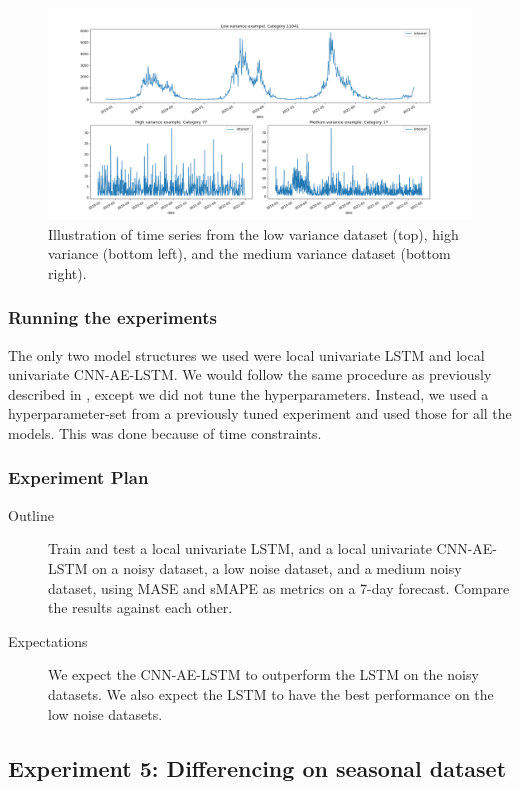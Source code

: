 \begin{figure}[h!]
  \centering
  \includegraphics[width=\textwidth]{./figs/code_generated/time-series-variance-examples.png}
  \hfill
  \caption{Illustration of time series from the low variance dataset (top), high variance (bottom left), and the medium variance dataset (bottom right).}
  \label{fig:time-series-variance-examples}
\end{figure}

\subsubsection{Running the experiments}
The only two model structures we used were local univariate LSTM
and local univariate CNN-AE-LSTM.
We would follow the same procedure as previously described in ,
except we did not tune the hyperparameters. Instead, we
used a hyperparameter-set from a previously tuned experiment and used those for all the models.
This was done because of time constraints.

\subsubsection{Experiment Plan}
\begin{description}
  \item[Outline]{
              Train and test a local univariate LSTM,
              and a local univariate CNN-AE-LSTM on a noisy dataset, a low noise dataset, and a medium noisy dataset,
              using MASE and sMAPE as metrics on a 7-day forecast.
              Compare the results against each other.
        }
\end{description}

\begin{description}
  \item[Expectations]{
              We expect the CNN-AE-LSTM to outperform the LSTM on the noisy datasets.
              We also expect the LSTM to have the best performance on the low noise datasets.
        }
\end{description}

\subsection{Experiment 5: Differencing on seasonal dataset}
